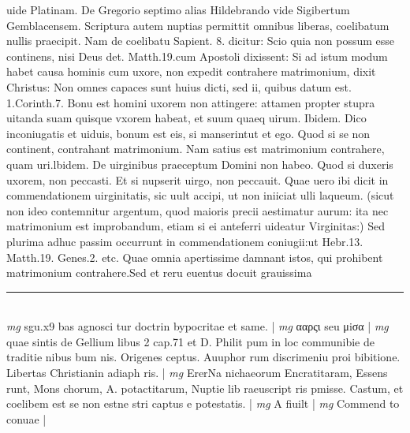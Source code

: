 \documentclass{article}
\begin{document}
\begin{pages}
uide Platinam. De Gregorio septimo alias Hildebrando vide Sigibertum Gemblacensem. Scriptura autem nuptias permittit omnibus liberas, coelibatum nullis praecipit. Nam de coelibatu Sapient. 8. dicitur: Scio quia non possum esse continens, nisi Deus det. Matth.19.cum Apostoli dixissent: Si ad istum modum habet causa hominis cum uxore, non expedit contrahere matrimonium, dixit Christus: Non omnes capaces sunt huius dicti, sed ii, quibus datum est. 1.Corinth.7. Bonu est homini uxorem non attingere: attamen propter stupra uitanda suam quisque vxorem habeat, et suum quaeq uirum. Ibidem. Dico inconiugatis et uiduis, bonum est eis, si manserintut et ego. Quod si se non continent, contrahant matrimonium. Nam satius est matrimonium contrahere, quam uri.lbidem. De uirginibus praeceptum Domini non habeo. Quod si duxeris uxorem, non peccasti. Et si nupserit uirgo, non peccauit. Quae uero ibi dicit in commendationem uirginitatis, sic uult accipi, ut non iniiciat ulli laqueum. (sicut non ideo contemnitur argentum, quod maioris precii aestimatur aurum: ita nec matrimonium est improbandum, etiam si ei anteferri uideatur Virginitas:) Sed plurima adhuc passim occurrunt in commendationem coniugii:ut Hebr.13. Matth.19. Genes.2. etc. Quae omnia apertissime damnant istos, qui prohibent matrimonium contrahere.Sed et reru euentus docuit grauissima  \pend
\vspace{0.5cm}\noindent
\vspace{0.2cm}\rule{1cm}{0.2pt}\\ 
\hspace{0.2cm}\textit{mg}
\footnotesize sgu.x9 bas agnosci tur doctrin bypocritae et same. 
\normalsize| 
\hspace{0.2cm}\textit{mg}
\footnotesize ααρςι seu μiσα 
\normalsize| 
\hspace{0.2cm}\textit{mg}
\footnotesize quae sintis de Gellium libus 2 cap.71 et D. Philit pum in loc communibie de traditie nibus bum nis. Origenes ceptus. Auuphor rum discrimeniu proi bibitione. Libertas Christianin adiaph ris. 
\normalsize| 
\hspace{0.2cm}\textit{mg}
\footnotesize ErerNa nichaeorum Encratitaram, Essens runt, Mons chorum, A. potactitarum, Nuptie lib raeuscript ris pmisse. Castum, et coelibem est se non estne stri captus e potestatis. 
\normalsize| 
\hspace{0.2cm}\textit{mg}
\footnotesize A fiuilt 
\normalsize| 
\hspace{0.2cm}\textit{mg}
\footnotesize Commend to conuae 
\normalsize| 

\end{pages}
\end{document}

